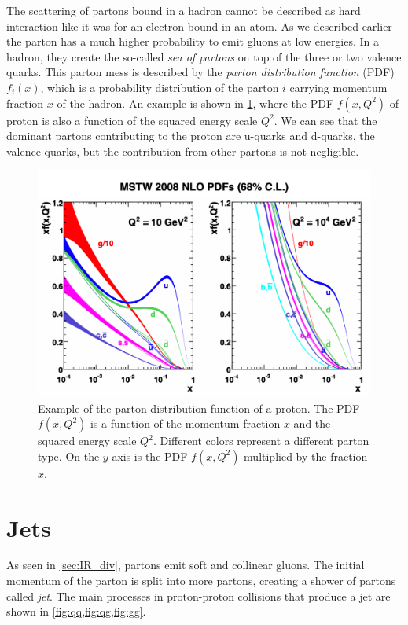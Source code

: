 The scattering of partons bound in a hadron cannot be described as hard interaction like it was for an electron bound in an atom.
As we described earlier the parton has a much higher probability to emit gluons at low energies.
In a hadron, they create the so-called \emph{sea of partons} on top of the three or two valence quarks.
This parton mess is described by the \emph{parton distribution function} (PDF) \cite{pdf_feynman} $f_i(x)$, which is a probability distribution of the parton $i$ carrying momentum fraction $x$ of the hadron.
An example is shown in \cref{fig:pdf}, where the PDF $f(x, Q^2)$ of proton is also a function of the squared energy scale $Q^2$.
We can see that the dominant partons contributing to the proton are u-quarks and d-quarks, the valence quarks, but the contribution from other partons is not negligible. 
\begin{figure}[htb]
    \centering
    \includegraphics[width=0.7\linewidth]{src/img/pdf.png}
    \caption[Example of the parton distribution function of a proton. The PDF $f(x, Q^2)$ is a function of the momentum fraction $x$ and the squared energy scale $Q^2$. Different colors represent a different parton type. On the $y$-axis is the PDF $f(x,Q^2)$ multiplied by the fraction $x$.]{Example of the parton distribution function of a proton. The PDF $f(x, Q^2)$ is a function of the momentum fraction $x$ and the squared energy scale $Q^2$. Different colors represent a different parton type. On the $y$-axis is the PDF $f(x,Q^2)$ multiplied by the fraction $x$. \footnotemark}
    \label{fig:pdf}
\end{figure}

\section{Jets}
\label{sec:jet}
As seen in \cref{sec:IR_div}, partons emit soft and collinear gluons.
The initial momentum of the parton is split into more partons, creating a shower of partons called \emph{jet}.
The main processes in proton-proton collisions that produce a jet are shown in \cref{fig:qq,fig:qg,fig:gg}.

